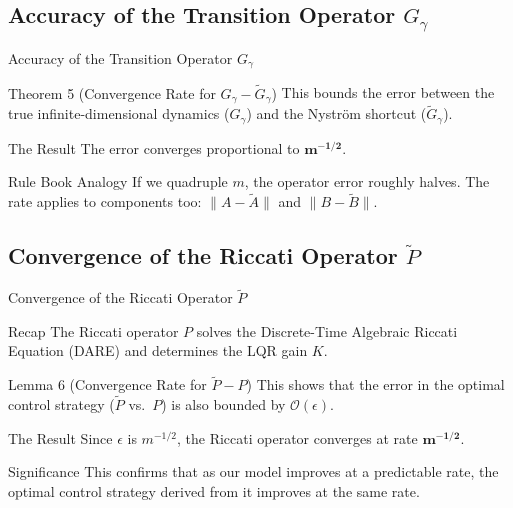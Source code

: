 \documentclass{beamer}
\begin{document}
\subsection{Accuracy of the Transition Operator 
  \texorpdfstring{$G_\gamma$}{G\_gamma}}
\begin{frame}{Accuracy of the Transition Operator 
  \texorpdfstring{$G_\gamma$}{G\_gamma}}
\begin{block}{Theorem 5 (Convergence Rate for 
  \texorpdfstring{$G_\gamma - \widetilde{G}_\gamma$}{G\_gamma - Gtilde})}
This bounds the error between the true infinite-dimensional dynamics ($G_\gamma$) and the Nyström shortcut ($\widetilde{G}_\gamma$).
\end{block}

\begin{block}{The Result}
The error converges proportional to $\mathbf{m^{-1/2}}$.
\end{block}

\begin{block}{Rule Book Analogy}
If we quadruple $m$, the operator error roughly halves. The rate applies to components too:
$\lVert A - \widetilde{A}\rVert$ and $\lVert B - \widetilde{B}\rVert$.
\end{block}
\end{frame}

\subsection{Convergence of the Riccati Operator 
  \texorpdfstring{$\widetilde{P}$}{Ptilde}}
\begin{frame}[allowframebreaks]{Convergence of the Riccati Operator 
  \texorpdfstring{$\widetilde{P}$}{Ptilde}}
\begin{block}{Recap}
  The Riccati operator $P$ solves the Discrete-Time Algebraic Riccati Equation (DARE) and determines the LQR gain $K$.
\end{block}

\begin{block}{Lemma 6 (Convergence Rate for $\widetilde{P} - P$)}
  This shows that the error in the optimal control strategy ($\widetilde{P}$ vs.\ $P$) is also bounded by $\mathcal{O}(\epsilon)$.
\end{block}

\framebreak

\begin{block}{The Result}
  Since $\epsilon$ is $m^{-1/2}$, the Riccati operator converges at rate $\mathbf{m^{-1/2}}$.
\end{block}

\begin{block}{Significance}
  This confirms that as our model improves at a predictable rate, the optimal control strategy derived from it improves at the same rate.
\end{block}
\end{frame}
\end{document}
